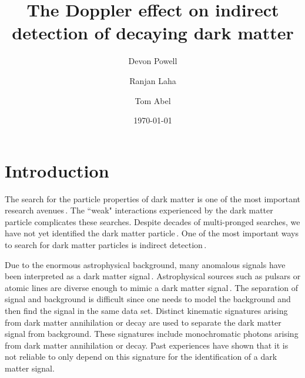 \documentclass[aps,prl,10pt,twocolumn,superscriptaddress,showpacs]{revtex4-1}
\begin{document}
\title{The Doppler effect on indirect detection of decaying dark matter}
\author{Devon Powell}
\author{Ranjan Laha}
\author{Tom Abel}
\date{\today}

\begin{abstract}
\cite{speckhard2016}
\end{abstract}


\maketitle


\section{Introduction}
\label{sec:Introduction}

The search for the particle properties of dark matter is one of the most important research avenues\,\cite{Jungman:1995df,Bertone:2004pz,Strigari:2013iaa}.  The ``weak" interactions experienced by the dark matter particle complicates these searches.  Despite decades of multi-pronged searches, we have not yet identified the dark matter particle\,\cite{Bertone:2016nfn}.  One of the most important ways to search for dark matter particles is indirect detection\,\cite{Klasen:2015uma}.

Due to the enormous astrophysical background, many anomalous signals have been interpreted as a  dark matter signal\,\cite{Abazajian:2014hsa,Daylan:2014rsa,Lee:2015fea,Bartels:2015aea,Bulbul:2014sua,Boyarsky:2014jta,Urban:2014yda}.  Astrophysical sources such as pulsars or atomic lines are diverse enough to mimic a dark matter signal\,\cite{O'Leary:2015gfa,Brandt:2015ula,O'Leary:2016osi,Gu:2015gqm,Phillips:2015wla,Shah:2016efh}.  The separation of signal and background is difficult since one needs to model the background and then find the signal in the same data set.  Distinct kinematic signatures arising from dark matter annihilation or decay are used to separate the dark matter signal from background.  These signatures include monochromatic photons arising from dark matter annihilation or decay.  Past experiences have shown that it is not reliable to only depend on this signature for the identification of a dark matter signal.
\end{document}
